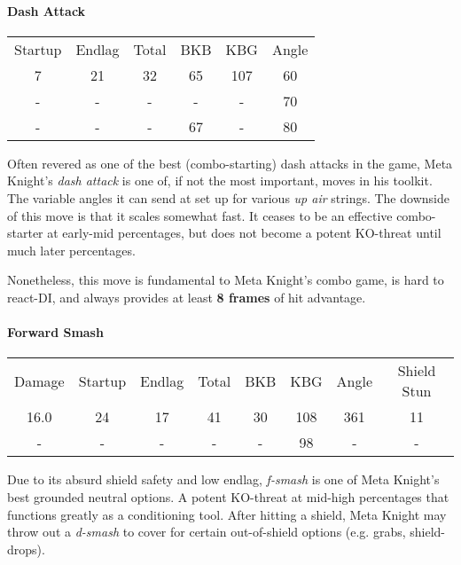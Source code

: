 \paragraph{Dash Attack}
\begin{center}
	\begin{tabular}{| c  c  c | c  c  c |}
		\hline
		Startup	& Endlag & Total & BKB & KBG & Angle \\
		7	&	21	&	32	&	65	&	107 & 	60\deg \\
		-	&	-	&	-	&	- 	& 	- 	&	70\deg	\\
		-	&	-	&	-	&	67	&	-	&	80\deg	\\
		\hline
	\end{tabular}
\end{center}
Often revered as one of the best (combo-starting) dash attacks in the game, %
 Meta Knight's \emph{dash attack} is one of, if not the most important, moves in his toolkit. The variable angles it can send at set up for various \textit{up air} strings. The downside of this move is that it scales somewhat fast. It ceases to be an effective combo-starter at early-mid percentages, but does not become a potent KO-threat until much later percentages.

Nonetheless, this move is fundamental to Meta Knight's combo game, is hard to react-DI, and always provides at least \textbf{8 frames} of hit advantage.

\paragraph{Forward Smash}
\begin{center}
	\begin{tabular}{| c | c  c  c | c  c  c | c |}
		\hline
		Damage 	&	Startup	& Endlag & Total & BKB 	& KBG 	& 	Angle 	&	Shield Stun	\\
		16.0		&	24		&	17	&	41	&	30	&	108 & 	361\deg	&	11 		\\
		-		&	-		&	-	&	-	&	- 	& 	98 	&	-		&	-		\\
		\hline
	\end{tabular}
\end{center}
Due to its absurd shield safety and low endlag, \textit{f-smash} is one of Meta Knight's best grounded neutral options. A potent KO-threat at mid-high percentages that functions greatly as a conditioning tool. After hitting a shield, Meta Knight may throw out a \textit{d-smash} to cover for certain out-of-shield options (e.g. grabs, shield-drops).

